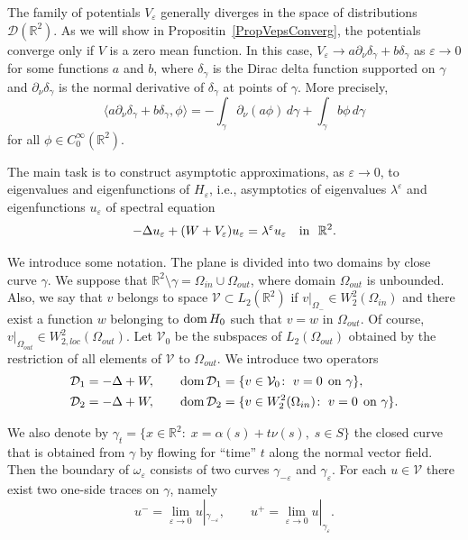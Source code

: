 \documentclass[reqno]{amsart}
\theoremstyle{plain}
\numberwithin{equation}{section}
\newcommand{\dom}{\mathop{\rm dom}}
\newcommand{\Real}{\mathbb R}
\newcommand{\eps}{\varepsilon}
\newcommand{\npt}{\partial_\nu}
\begin{document}
The family of potentials $V_\eps$ generally diverges in the space of distributions $\mathcal{D}(\Real^2)$.
As we will show  in Propositin~\ref{PropVepsConverg},
the  potentials converge only if $V$ is a zero mean function. In this case,
$V_\eps\to a \partial_\nu\delta_\gamma+b\delta_\gamma$ as $\eps\to 0$ for some functions $a$ and $b$,
where $\delta_\gamma$ is the Dirac delta function supported on $\gamma$ and $\partial_\nu\delta_\gamma$ is the normal derivative of $\delta_\gamma$ at points of $\gamma$. More precisely,
\begin{equation*}
  \langle a\partial_\nu\delta_\gamma+b \delta_\gamma, \phi \rangle= -\int_\gamma  \npt(a\phi)\,d\gamma+\int_\gamma b \phi\,d\gamma
\end{equation*}
for all $\phi\in C^\infty_0(\Real^2)$.



The main task is to construct asymptotic approximations, as $\eps\to 0$, to eigenvalues  and eigenfunctions of $H_\eps$, i.e., asymptotics of eigenvalues $\lambda^\eps$ and eigenfunctions $u_\eps$ of spectral equation
\begin{equation}\label{SpectralEqn}
-\Delta u_\eps +(W+V_\eps) u_\eps= \lambda^\eps u_\eps\quad \hbox{in \ } \Real^2.
\end{equation}





We  introduce some notation. The plane is divided into two domains by close curve $\gamma$.  We suppose that $\Real^2\setminus\gamma=\Omega_{in}\cup\Omega_{out}$, where domain $\Omega_{out}$ is unbounded. Also, we say that $v$ belongs to space $\mathcal{V}\subset L_2(\Real^2)$ if $v|_{\Omega_-}\in W_2^2(\Omega_{in})$ and there exist a function $w$ belonging to $\dom H_0$ such that $v=w$ in $\Omega_{out}$. Of course, $v|_{\Omega_{out}}\in W_{2,loc}^2(\Omega_{out})$.
Let $\mathcal{V}_0$ be the subspaces of $L_2(\Omega_{out})$
obtained by the restriction of all elements of $\mathcal{V}$ to $\Omega_{out}$.   We introduce two operators
\begin{align*}
&\mathcal{D}_1= -\Delta+W, \qquad \dom \mathcal{D}_1=\{v\in \mathcal{V}_0\colon\; v=0 \;\,\mbox{on } \gamma\},\\
&\mathcal{D}_2= -\Delta+W, \qquad \dom \mathcal{D}_2=\{v\in W_2^2(\Omega_{in})\colon\; v=0 \;\,\mbox{on } \gamma\}.
\end{align*}


We also denote by $\gamma_t=\{x\in\Real^2\colon\; x=\alpha(s)+t\nu(s), \; s\in S\}$ the closed curve that is obtained from $\gamma$ by flowing for ``time'' $t$ along the normal vector field. Then the boundary of $\omega_\eps$ consists of two curves $\gamma_{-\eps}$ and $\gamma_{\eps}$. For each $u\in \mathcal{V}$ there exist two one-side traces on $\gamma$, namely
\begin{equation}\label{UpmNotation}
  u^-=\lim_{\eps\to 0}u|_{\gamma_{-\eps}}, \qquad
u^+=\lim_{\eps\to 0}u|_{\gamma_{\eps}}.
\end{equation}
\end{document}

